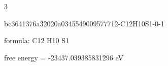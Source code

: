 \documentclass{article}
\begin{document}
3

\vspace{1cm}


bc3641376a32020a0345549009577712-C12H10S1-0-1



formula: C12 H10 S1



free energy = -23437.039385831296 eV
\end{document}
